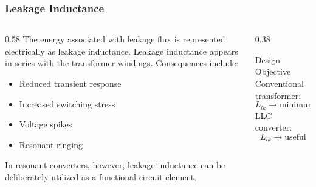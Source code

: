 \begin{frame}
    \frametitle{Leakage Inductance}
    \begin{columns}
        \begin{column}{0.58\textwidth}
            The energy associated with leakage flux is represented electrically as leakage inductance.
            \vspace{0.15cm}
            Leakage inductance appears in series with the transformer windings.
            \vspace{0.15cm}
            Consequences include:
            \begin{itemize}
                \item Reduced transient response
                \item Increased switching stress
                \item Voltage spikes
                \item Resonant ringing
            \end{itemize}
            \vspace{0.15cm}
            In resonant converters, however, leakage inductance can be deliberately utilized as a functional circuit element.
        \end{column}
        \begin{column}{0.38\textwidth}
            \begin{block}{Design Objective}
                Conventional transformer:
                \begin{equation}
                    L_{lk}
                    \rightarrow
                    \mathrm{minimum}
                \end{equation}
                \vspace{0.15cm}
                LLC converter:
                \begin{equation}
                    L_{lk}
                    \rightarrow
                    \mathrm{useful}
                \end{equation}
            \end{block}
        \end{column}
    \end{columns}
\end{frame}


